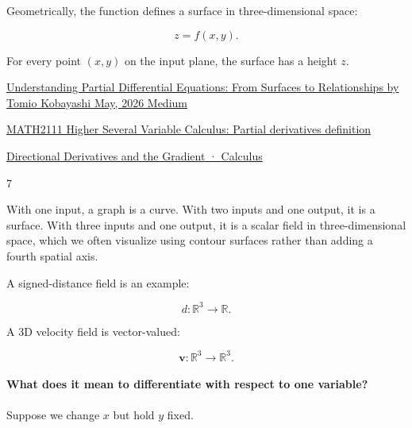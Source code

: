 Geometrically, the function defines a surface in three-dimensional space:

\[
z=f(x,y).
\]

For every point \((x,y)\) on the input plane, the surface has a height \(z\).

\href{https://images.openai.com/static-rsc-4/GEWWaskcvDs-k2bsfVrRmlEzSQf7QE6m-7riYWFEmjdlQQz374f8l37I0H_qhF8skoNnV5akPnFXPgxsB0R5XVBdkVoZ4mggd_v0u-1BSl56lHDmRf8nQjxd5CDCdry1u_oubL3XSLuw5LwhNU2Y7wf0_B7wqYeZegMjquLa938?purpose=inline}{Understanding Partial Differential Equations: From Surfaces to Relationships \textbar{} by Tomio Kobayashi \textbar{} May, 2026 \textbar{} Medium}

\href{https://images.openai.com/static-rsc-4/e1nonwR6E_jbX1gzC3b2FD5d-QIIrLwkQhy-t7IFdjG_hoMsT-A2Sk6F_QM8Jwz3-lgOqkHr03ugrEHklNd7B963N8uKfSViTHdmD7gf3W2lUH6JaOU7qDr2e4h-BapYF6XNLyBGReGHnwMLCB0kubuwT4Ec80aioW9MUPw5IoA?purpose=inline}{MATH2111 Higher Several Variable Calculus: Partial derivatives definition}

\href{https://images.openai.com/static-rsc-4/MtStZWdgED9mKU6EnkX1k_zlh4L3TWo-GNfhGqa5OirCu2UqgHU1RDOc_KWqWGx4LvoxpyNeJD9le0CUU_moeDOftB-Tv5JU_33TqQg3AYkU_y2mzNrrzsQlPUtGln7B37nN0ug6FVtEWCW8T5tMoWrpR9uHgd9H2YPZXXUQm74?purpose=inline}{Directional Derivatives and the Gradient · Calculus}

7

With one input, a graph is a curve. With two inputs and one output, it is a surface. With three inputs and one output, it is a scalar field in three-dimensional space, which we often visualize using contour surfaces rather than adding a fourth spatial axis.

A signed-distance field is an example:

\[
d:\mathbb R^3\rightarrow\mathbb R.
\]

A 3D velocity field is vector-valued:

\[
\mathbf v:\mathbb R^3\rightarrow\mathbb R^3.
\]

\paragraph{What does it mean to differentiate with respect to one variable?}\label{02-foundations-ii-ch021-what-does-it-mean-to-differentiate-with-respect-to-one-variable}

\hypertarget{02-foundations-ii-ch021-what-does-it-mean-to-differentiate-with-respect-to-one-variable}{}

Suppose we change \(x\) but hold \(y\) fixed.

